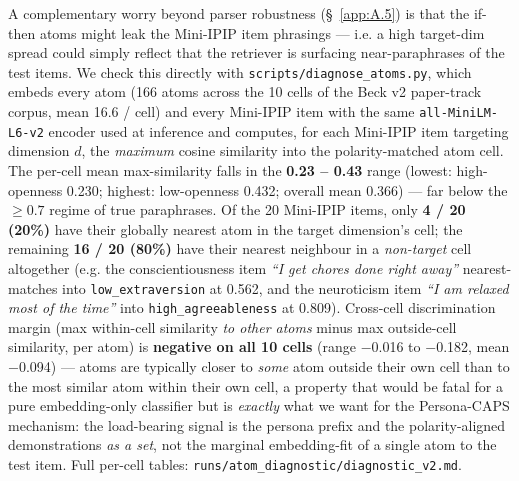 A complementary worry beyond parser robustness (\S~\ref{app:A.5}) is that the if-then atoms might leak the Mini-IPIP item phrasings --- i.e. a high target-dim spread could simply reflect that the retriever is surfacing near-paraphrases of the test items. We check this directly with \texttt{scripts/\allowbreak{}diagnose\_\allowbreak{}atoms.py}, which embeds every atom (166 atoms across the 10 cells of the Beck v2 paper-track corpus, mean 16.6 / cell) and every Mini-IPIP item with the same \texttt{all-\allowbreak{}MiniLM-\allowbreak{}L6-\allowbreak{}v2} encoder used at inference and computes, for each Mini-IPIP item targeting dimension $d$, the \textit{maximum} cosine similarity into the polarity-matched atom cell. The per-cell mean max-similarity falls in the \textbf{0.23 -- 0.43} range (lowest: high-openness 0.230; highest: low-openness 0.432; overall mean 0.366) --- far below the $\geq 0.7$ regime of true paraphrases. Of the 20 Mini-IPIP items, only \textbf{4 / 20 (20\%)} have their globally nearest atom in the target dimension's cell; the remaining \textbf{16 / 20 (80\%)} have their nearest neighbour in a \textit{non-target} cell altogether (e.g. the conscientiousness item \textit{``I get chores done right away''} nearest-matches into \texttt{low\_\allowbreak{}extraversion} at 0.562, and the neuroticism item \textit{``I am relaxed most of the time''} into \texttt{high\_\allowbreak{}agreeableness} at 0.809). Cross-cell discrimination margin (max within-cell similarity \textit{to other atoms} minus max outside-cell similarity, per atom) is \textbf{negative on all 10 cells} (range $-$0.016 to $-$0.182, mean $-$0.094) --- atoms are typically closer to \textit{some} atom outside their own cell than to the most similar atom within their own cell, a property that would be fatal for a pure embedding-only classifier but is \textit{exactly} what we want for the Persona-CAPS mechanism: the load-bearing signal is the persona prefix and the polarity-aligned demonstrations \textit{as a set}, not the marginal embedding-fit of a single atom to the test item. Full per-cell tables: \texttt{runs/\allowbreak{}atom\_\allowbreak{}diagnostic/\allowbreak{}diagnostic\_\allowbreak{}v2.md}.

